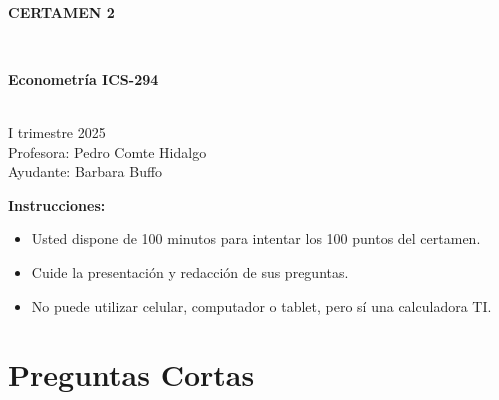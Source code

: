 \documentclass[10pt,a4paper]{article}
\begin{document}
\vspace{5cm}



\begin{center}
\begin{large}
\textbf{\\CERTAMEN 2}
\end{large}\\
\end{center}

\begin{center}
\begin{large}
\textbf{Econometría ICS-294}
\end{large}\\
\vspace{0.2cm}
I trimestre 2025\\
Profesora: Pedro Comte Hidalgo\\
Ayudante: Barbara Buffo
\end{center}

\textbf{Instrucciones:} 

\begin{itemize}

    \item Usted dispone de 100 minutos  para intentar los 100 puntos del certamen.
    \item Cuide la presentación y redacción de sus preguntas.
    \item No puede utilizar celular, computador o tablet, pero sí una calculadora TI.
     
\end{itemize}

\section{Preguntas Cortas}
\end{document}

